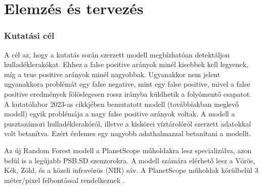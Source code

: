 \chapter{Elemzés és tervezés}
\label{ch:spec}

\subsection {Kutatási cél}

A cél az, hogy a kutatás során szerzett modell megbízhatóan detektáljon hulladéklerakókat. Ehhez a false positive arányok minél kisebbek kell legyenek, míg a true positive arányok minél nagyobbak. Ugyanakkor nem jelent ugyanakkora problémát egy false negative, mint egy false positive, mivel a false positive eredmények fölöslegesen rossz irányba küldhetik a folyómentő csapatot. 
A kutatólabor 2023-as cikkjében bemutatott modell (továbbiakban meglevő modell) egyik problémája a nagy false positive arányok voltak. A modell a pusztazámori hulladéklerakóról, illetve a kiskörei víztárolóról szerzett adatokkal volt betanítva. Ezért érdemes egy nagyobb adathalmazzal betanítani a modellt.

Az új Random Forest modell a PlanetScope műholdakra lesz specializálva, azon belül is a legújabb PSB.SD szenzorokra. A modell számára elérhető lesz a Vörös, Kék, Zöld, és a közeli infravörös (NIR) sáv. A PlanetScope műholdak körülbelül 3 méter/pixel felbontással rendelkeznek \cite{planetsensors2024,planetresolution2024}. 


